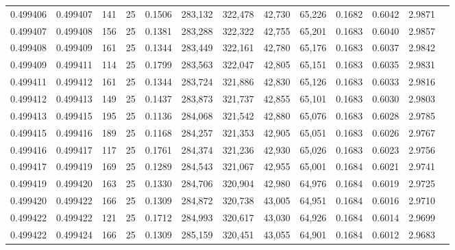 \begin{tabular}{rrrrrrrrrrrrr}
0.499406 & 0.499407 & 141 &  25 &                                     0.1506 & 283,132 & 322,478 &  42,730 &  65,226 & 0.1682 & 0.6042 & 2.9871 \\
0.499407 & 0.499408 & 156 &  25 &                                     0.1381 & 283,288 & 322,322 &  42,755 &  65,201 & 0.1683 & 0.6040 & 2.9857 \\
0.499408 & 0.499409 & 161 &  25 &                                     0.1344 & 283,449 & 322,161 &  42,780 &  65,176 & 0.1683 & 0.6037 & 2.9842 \\
0.499409 & 0.499411 & 114 &  25 &                                     0.1799 & 283,563 & 322,047 &  42,805 &  65,151 & 0.1683 & 0.6035 & 2.9831 \\
0.499411 & 0.499412 & 161 &  25 &                                     0.1344 & 283,724 & 321,886 &  42,830 &  65,126 & 0.1683 & 0.6033 & 2.9816 \\
0.499412 & 0.499413 & 149 &  25 &                                     0.1437 & 283,873 & 321,737 &  42,855 &  65,101 & 0.1683 & 0.6030 & 2.9803 \\
0.499413 & 0.499415 & 195 &  25 &                                     0.1136 & 284,068 & 321,542 &  42,880 &  65,076 & 0.1683 & 0.6028 & 2.9785 \\
0.499415 & 0.499416 & 189 &  25 &                                     0.1168 & 284,257 & 321,353 &  42,905 &  65,051 & 0.1683 & 0.6026 & 2.9767 \\
0.499416 & 0.499417 & 117 &  25 &                                     0.1761 & 284,374 & 321,236 &  42,930 &  65,026 & 0.1683 & 0.6023 & 2.9756 \\
0.499417 & 0.499419 & 169 &  25 &                                     0.1289 & 284,543 & 321,067 &  42,955 &  65,001 & 0.1684 & 0.6021 & 2.9741 \\
0.499419 & 0.499420 & 163 &  25 &                                     0.1330 & 284,706 & 320,904 &  42,980 &  64,976 & 0.1684 & 0.6019 & 2.9725 \\
0.499420 & 0.499422 & 166 &  25 &                                     0.1309 & 284,872 & 320,738 &  43,005 &  64,951 & 0.1684 & 0.6016 & 2.9710 \\
0.499422 & 0.499422 & 121 &  25 &                                     0.1712 & 284,993 & 320,617 &  43,030 &  64,926 & 0.1684 & 0.6014 & 2.9699 \\
0.499422 & 0.499424 & 166 &  25 &                                     0.1309 & 285,159 & 320,451 &  43,055 &  64,901 & 0.1684 & 0.6012 & 2.9683 \\

\end{tabular}

